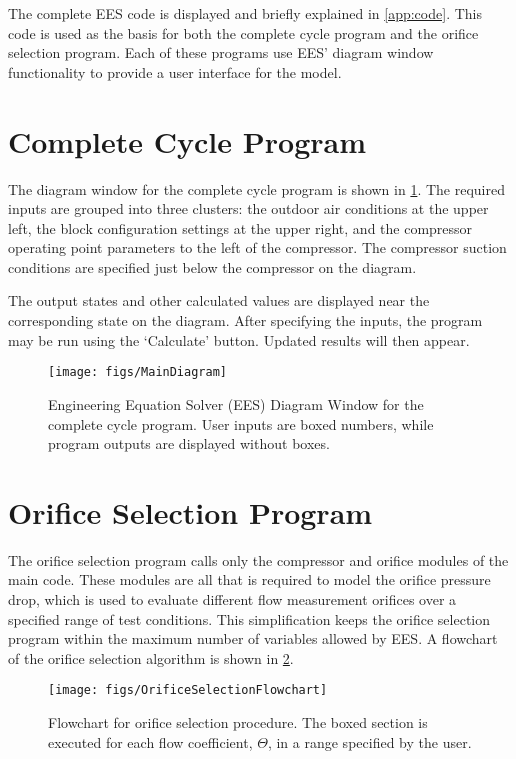 The complete EES code is displayed and briefly explained in \cref{app:code}.
This code is used as the basis for both the complete cycle program and the 
orifice selection program. Each of these programs use EES' diagram window functionality
to provide a user interface for the model.

\section{Complete Cycle Program} \label{sec:MainModel}
The diagram window for the complete cycle program is shown in \cref{fig:MainDiag}.
The required inputs are grouped into three clusters: the outdoor air conditions
at the upper left, the block configuration settings at the upper right, and
the compressor operating point parameters to the left of the compressor.
The compressor suction conditions are specified just below the compressor
on the diagram.

The output states and other calculated values are displayed near the corresponding
state on the diagram. After specifying the inputs, the program may be run using
the `Calculate' button. Updated results will then appear.
\begin{figure}[htbp]
  \centering
  \texttt{[image: figs/MainDiagram]}
  \caption{Engineering Equation Solver (EES) Diagram Window for the complete
    cycle program. User inputs are boxed numbers, while program outputs are displayed without boxes.}
  \label{fig:MainDiag}
\end{figure}

\section{Orifice Selection Program} \label{sec:OrifSelect}
The orifice selection program calls only the 
compressor and orifice modules of the main code.
These modules are all that is required to model the orifice pressure drop,
which is used to evaluate different flow measurement orifices over a specified
range of test conditions.
This simplification keeps the orifice selection program within the maximum
number of variables allowed by EES.
A flowchart of the orifice selection algorithm is shown in \cref{fig:FlowOrifSelect}.
\begin{figure}[htbp]
  \centering
  \texttt{[image: figs/OrificeSelectionFlowchart]}
  \caption{Flowchart for orifice selection procedure. 
    The boxed section is executed for each flow coefficient, $\Theta$,
    in a range specified by the user.}
  \label{fig:FlowOrifSelect}
\end{figure}

